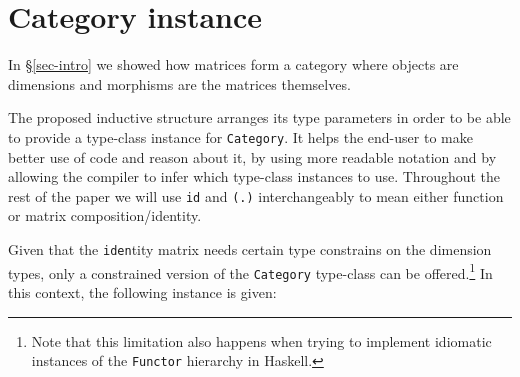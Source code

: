 \documentclass[sigplan]{acmart}\settopmatter{}
\newcommand{\hs}{\texttt}
\begin{document}
%
%
%

\section{Category instance}\label{sec:cat}

In \S\ref{sec-intro} we showed how matrices form a category where objects are dimensions and morphisms are the matrices themselves.

The proposed inductive structure arranges its type parameters in order to be able to provide a type-class instance for \hs{Category}. It helps the end-user to make better use of code and reason about it, by using more readable notation and by allowing the compiler to infer which type-class instances to use. Throughout the rest of the paper we will use \hs{id} and \hs{(.)} interchangeably to mean either function or matrix composition/identity.

Given that the \hs{iden}tity matrix needs certain type constrains on the dimension types, only a constrained version of the \hs{Category} type-class can be offered.\footnote{Note that this limitation also happens when trying to implement idiomatic instances of the \hs{Functor} hierarchy in Haskell.
} In this context, the following instance is given:
\end{document}
